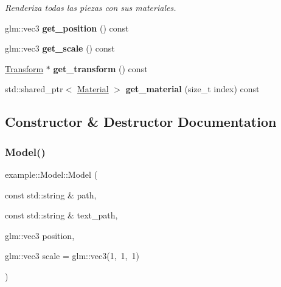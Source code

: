 \begin{DoxyCompactItemize}
\begin{DoxyCompactList}\small\item\em Renderiza todas las piezas con sus materiales. \end{DoxyCompactList}\item 
\mbox{\label{classexample_1_1_model_a23d2cf3c1f775c9ae988714d5b242fdf}} 
glm\+::vec3 {\bfseries get\+\_\+position} () const
\item 
\mbox{\label{classexample_1_1_model_a5e452f702c97b263d16a603ceb08c871}} 
glm\+::vec3 {\bfseries get\+\_\+scale} () const
\item 
\mbox{\label{classexample_1_1_model_a659eec889496a1f84b7341a46b004b31}} 
\mbox{\hyperlink{classexample_1_1_transform}{Transform}} $\ast$ {\bfseries get\+\_\+transform} () const
\item 
\mbox{\label{classexample_1_1_model_a36bb0739806bd2add78a11f8e2cd7617}} 
std\+::shared\+\_\+ptr$<$ \mbox{\hyperlink{classexample_1_1_material}{Material}} $>$ {\bfseries get\+\_\+material} (size\+\_\+t index) const
\end{DoxyCompactItemize}


\subsection{Constructor \& Destructor Documentation}
\mbox{\label{classexample_1_1_model_acdfb26d4a8616aaaec055e1da4ce4331}} 
\subsubsection{\texorpdfstring{Model()}{Model()}\hspace{0.1cm}{\footnotesize\ttfamily [1/2]}}
{\footnotesize\ttfamily example\+::\+Model\+::\+Model (\begin{DoxyParamCaption}\item[{const std\+::string \&}]{path,  }\item[{const std\+::string \&}]{text\+\_\+path,  }\item[{glm\+::vec3}]{position,  }\item[{glm\+::vec3}]{scale = {\ttfamily glm\+:\+:vec3(1,~1,~1)} }\end{DoxyParamCaption})}



